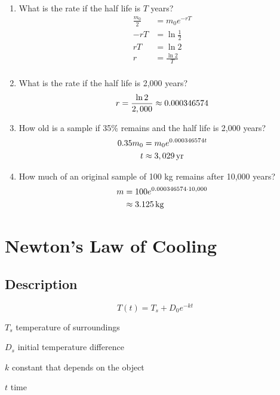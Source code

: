\documentclass{exam}
\begin{document}
  \begin{enumerate}
    \item What is the rate if the half life is $T$ years?
      \begin{align*}
        \frac{m_0}{2} &= m_0 e^{-rT} \\
        -rT           &= \ln \frac{1}{2} \\
        rT            &= \ln 2 \\
        r             &= \frac{\ln 2}{T} \\
      \end{align*}

    \item What is the rate if the half life is 2,000 years?
      \[
        r = \frac{\ln 2}{2,000} \approx 0.000346574 \\
      \]

    \item How old is a sample if 35\% remains and the half life is 2,000 years?
      \begin{align*}
        0.35 m_0 & = m_0 e^{0.000346574 t} \\
        t        & \approx \unit[3,029]{yr} \\
      \end{align*}

    \item How much of an original sample of 100 kg remains after 10,000 years?
      \begin{align*}
        m & = 100 e^{0.000346574 \cdot 10,000} \\
          & \approx \unit[3.125]{kg} \\
      \end{align*}
  \end{enumerate}

  \section{Newton's Law of Cooling}

  \subsection{Description}
  \[
    T(t) = T_s + D_0 e^{-kt}
  \]

  \begin{itemize*}
    \item $T_s$ temperature of surroundings
    \item $D_s$ initial temperature difference
    \item $k$ constant that depends on the object
    \item $t$ time
  \end{itemize*}
\end{document}
